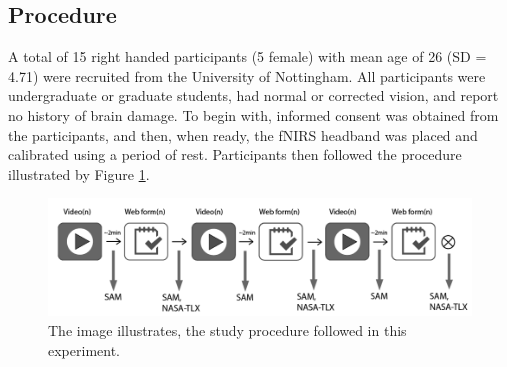 \documentclass[../main/Feedback.tex]{subfiles}
\begin{document}

\subsection{Procedure}
A total of 15 right handed participants (5 female) with mean age of 26 (SD = 4.71) were recruited from the University of Nottingham.
All participants were undergraduate or graduate students, had normal or corrected vision, and report no history of brain damage. %
To begin with, informed consent was obtained from the participants, and then, when ready, the fNIRS headband was placed and calibrated using a period of rest. Participants then followed the procedure illustrated by Figure \ref{fig:study-procedure}. 


\begin{figure}[h]
	\centering
	\includegraphics[width=\linewidth]{../figures/study-procedure}
	\caption[study procedure]{The image illustrates, the study procedure followed in this experiment.}
	\label{fig:study-procedure}
\end{figure}
\end{document}
